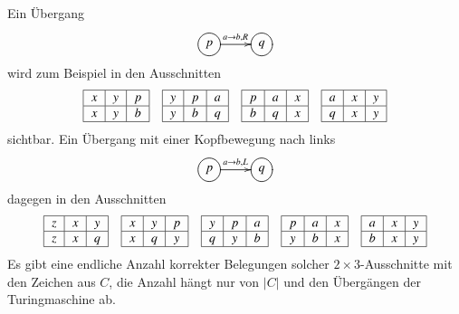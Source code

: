 Ein Übergang
\[
\entrymodifiers={++[o][F]}
\xymatrix{
p\ar[r]^{a\to b,R}
	&q
}
\]
wird zum Beispiel in den Ausschnitten
\[
\begin{tabular}{|c|c|c|}
\hline
$x$&$y$&$p$\\
\hline
$x$&$y$&$b$\\
\hline
\end{tabular}
\quad
\begin{tabular}{|c|c|c|}
\hline
$y$&$p$&$a$\\
\hline
$y$&$b$&$q$\\
\hline
\end{tabular}
\quad
\begin{tabular}{|c|c|c|}
\hline
$p$&$a$&$x$\\
\hline
$b$&$q$&$x$\\
\hline
\end{tabular}
\quad
\begin{tabular}{|c|c|c|}
\hline
$a$&$x$&$y$\\
\hline
$q$&$x$&$y$\\
\hline
\end{tabular}
\]
sichtbar. Ein Übergang mit einer Kopfbewegung nach links
\[
\entrymodifiers={++[o][F]}
\xymatrix{
p\ar[r]^{a\to b,L}
	&q
}
\]
dagegen in den Ausschnitten
\[
\begin{tabular}{|c|c|c|}
\hline
$z$&$x$&$y$\\
\hline
$z$&$x$&$q$\\
\hline
\end{tabular}
\quad
\begin{tabular}{|c|c|c|}
\hline
$x$&$y$&$p$\\
\hline
$x$&$q$&$y$\\
\hline
\end{tabular}
\quad
\begin{tabular}{|c|c|c|}
\hline
$y$&$p$&$a$\\
\hline
$q$&$y$&$b$\\
\hline
\end{tabular}
\quad
\begin{tabular}{|c|c|c|}
\hline
$p$&$a$&$x$\\
\hline
$y$&$b$&$x$\\
\hline
\end{tabular}
\quad
\begin{tabular}{|c|c|c|}
\hline
$a$&$x$&$y$\\
\hline
$b$&$x$&$y$\\
\hline
\end{tabular}
\]
Es gibt eine endliche Anzahl korrekter Belegungen solcher
$2\times 3$-Ausschnitte mit den Zeichen aus $C$, die Anzahl
hängt nur von $|C|$ und den Übergängen der Turingmaschine ab.

